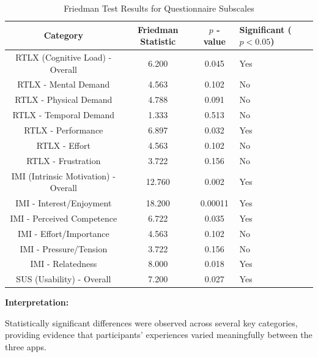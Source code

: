 \documentclass{CPP}
\begin{document}
\begin{table}[h!]
    \centering
    \caption{Friedman Test Results for Questionnaire Subscales}
    \label{tab:friedman-results}
    \begin{tabular}{|c|c|c|p{2.2cm}|}
        \hline
        \textbf{Category} & \textbf{Friedman Statistic} & \textbf{$p$ - value} & \textbf{Significant ($p < 0.05$)} \\
        \hline
        RTLX (Cognitive Load) - Overall & 6.200 & 0.045 & Yes \\
        RTLX - Mental Demand & 4.563 & 0.102 & No \\
        RTLX - Physical Demand & 4.788 & 0.091 & No \\
        RTLX - Temporal Demand & 1.333 & 0.513 & No \\
        RTLX - Performance & 6.897 & 0.032 & Yes \\
        RTLX - Effort & 4.563 & 0.102 & No \\
        RTLX - Frustration & 3.722 & 0.156 & No \\
        IMI (Intrinsic Motivation) - Overall & 12.760 & 0.002 & Yes \\
        IMI - Interest/Enjoyment & 18.200 & 0.00011 & Yes \\
        IMI - Perceived Competence & 6.722 & 0.035 & Yes \\
        IMI - Effort/Importance & 4.563 & 0.102 & No \\
        IMI - Pressure/Tension & 3.722 & 0.156 & No \\
        IMI - Relatedness & 8.000 & 0.018 & Yes \\
        SUS (Usability) - Overall & 7.200 & 0.027 & Yes \\
        \hline
    \end{tabular}
\end{table}

\textbf{Interpretation:}

Statistically significant differences were observed across several key categories, providing evidence that participants' experiences varied meaningfully between the three apps.
\end{document}
